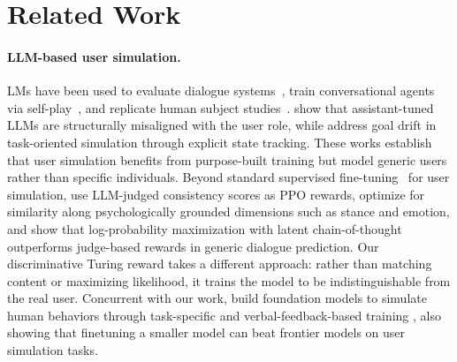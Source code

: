 \documentclass{article} %
\begin{document}
\section{Related Work}

\paragraph{LLM-based user simulation.}
LMs have been used to evaluate dialogue systems~\citep{davidson2023user, sekulic2024simulating, sim2real, humt}, train conversational agents via self-play~\citep{shah2018bootstrapping, abdulhai2025consistently, utility}, and replicate human subject studies~\citep{aher2023using, park2023generative}. \citet{naous2025flipping} show that assistant-tuned LLMs are structurally misaligned with the user role, while \citet{mehri2025goal} address goal drift in task-oriented simulation through explicit state tracking. These works establish that user simulation benefits from purpose-built training but model generic users rather than specific individuals.
Beyond standard supervised fine-tuning~\citep{wolf2019transfertransfo} for user simulation, \citet{abdulhai2025consistently} use LLM-judged consistency scores as PPO rewards, \citet{wu2026humanlm} optimize for similarity along psychologically grounded dimensions such as stance and emotion, and \citet{gandhi2026dialogue} show that log-probability maximization with latent chain-of-thought outperforms judge-based rewards in generic dialogue prediction. Our discriminative Turing reward takes a different approach: rather than matching content or maximizing likelihood, it trains the model to be indistinguishable from the real user. Concurrent with our work, \citet{OdysSim} build foundation models to simulate human behaviors through task-specific and verbal-feedback-based training \citep{verbal_feedback}, also showing that finetuning a smaller model can beat frontier models on user simulation tasks.
\end{document}
